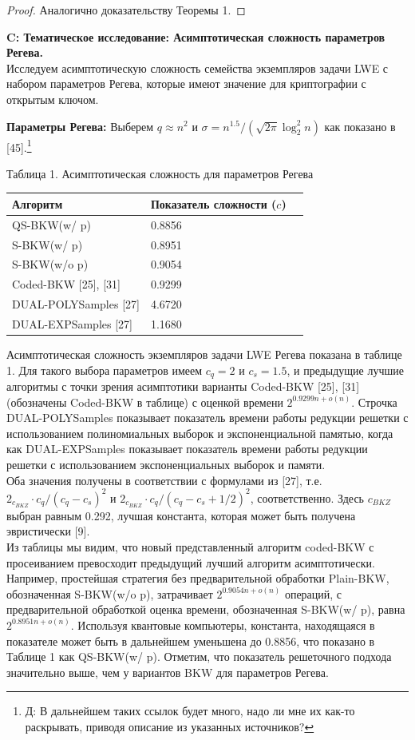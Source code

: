 \documentclass[a4paper,11pt]{article}
\begin{document}
\begin{proof}
Аналогично доказательству Теоремы 1.
\end{proof}

\textbf{C: Тематическое исследование: Асимптотическая сложность параметров Регева.}\\

Исследуем асимптотическую сложность семейства экземпляров задачи LWE с набором параметров Регева, которые имеют значение для криптографии с открытым ключом.

\textbf{Параметры Регева:} Выберем $q \approx n^2$  и $\sigma = n^{1.5}/(\sqrt{2 \pi} \log_2^2{n})$ как показано в [45].\footnote{Д: В дальнейшем таких ссылок будет много, надо ли мне их как-то раскрывать, приводя описание из указанных источников?}

\begin{center}
Таблица 1. Асимптотическая сложность для параметров Регева
\begin{tabular}{ | l | l | l | }
\hline
Алгоритм & Показатель сложности ($c$) \\ \hline
QS-BKW(w/ p) & 0.8856 \\
S-BKW(w/ p) & 0.8951 \\
S-BKW(w/o p) & 0.9054 \\
Coded-BKW [25], [31] & 0.9299 \\
DUAL-POLYSamples [27] & 4.6720\\
DUAL-EXPSamples [27] & 1.1680\\
\hline
\end{tabular}
\end{center}

Асимптотическая сложность экземпляров задачи LWE Регева показана в таблице 1. Для такого выбора параметров имеем $c_q=2$ и $c_s=1.5$, и предыдущие лучшие алгоритмы с точки зрения асимптотики варианты Coded-BKW [25], [31] (обозначены Coded-BKW в таблице) с оценкой времени $2^{0.9299n + o(n)}$. Строчка DUAL-POLYSamples показывает показатель времени работы редукции решетки с использованием полиномиальных выборок и экспоненциальной памятью, когда как DUAL-EXPSamples показывает показатель времени работы редукции решетки с использованием экспоненциальных выборок и памяти. \\
Оба значения получены в соответствии с формулами из [27], т.е. $2_{c_{BKZ}} \cdot c_q/(c_q - c_s)^2$ и $2_{c_{BKZ}} \cdot c_q/(c_q - c_s + 1/2)^2$, соответственно. Здесь $c_{BKZ}$ выбран равным 0.292, лучшая константа, которая может быть получена эвристически [9].\\
Из таблицы мы видим, что новый представленный алгоритм coded-BKW с просеиванием превосходит предыдущий лучший алгоритм асимптотически. Например, простейшая стратегия без предварительной обработки Plain-BKW, обозначенная S-BKW(w/o p), затрачивает $2^{0.9054n+o(n)}$ операций, с предварительной обработкой оценка времени, обозначенная S-BKW(w/ p), равна $2^{0.8951n+o(n)}$. Используя квантовые компьютеры, константа, находящаяся в показателе может быть в дальнейшем уменьшена до 0.8856, что показано в Таблице 1 как QS-BKW(w/ p). Отметим, что показатель решеточного подхода значительно выше, чем у вариантов BKW для параметров Регева.
\end{document}
